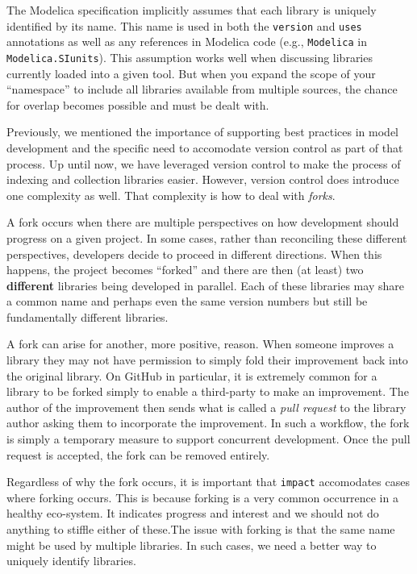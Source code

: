 \documentclass[11pt,a4paper,twocolumn]{article}
\newcommand{\code}[1]{\texttt{#1}} %
\begin{document}
The Modelica specification implicitly assumes that each library is
uniquely identified by its name.  This name is used in both the
\code{version} and \code{uses} annotations as well as any references
in Modelica code (e.g., \code{Modelica} in \code{Modelica.SIunits}).
This assumption works well when discussing libraries currently loaded
into a given tool.  But when you expand the scope of your
``namespace'' to include all libraries available from multiple
sources, the chance for overlap becomes possible and must be dealt
with.

Previously, we mentioned the importance of supporting best practices
in model development and the specific need to accomodate version
control as part of that process.  Up until now, we have leveraged
version control to make the process of indexing and collection
libraries easier.  However, version control does introduce one
complexity as well.  That complexity is how to deal with \emph{forks}.

A fork occurs when there are multiple perspectives on how development
should progress on a given project.  In some cases, rather than
reconciling these different perspectives, developers decide to proceed
in different directions.  When this happens, the project becomes
``forked'' and there are then (at least) two \textbf{different} libraries
being developed in parallel.  Each of these libraries may share a
common name and perhaps even the same version numbers but still be
fundamentally different libraries.

A fork can arise for another, more positive, reason.  When someone
improves a library they may not have permission to simply fold their
improvement back into the original library.  On GitHub in particular,
it is extremely common for a library to be forked simply to enable a
third-party to make an improvement.  The author of the improvement
then sends what is called a \emph{pull request} to the library author
asking them to incorporate the improvement.  In such a workflow, the
fork is simply a temporary measure to support concurrent development.
Once the pull request is accepted, the fork can be removed entirely.

Regardless of why the fork occurs, it is important that \code{impact}
accomodates cases where forking occurs.  This is because forking is a
very common occurrence in a healthy eco-system.  It indicates progress
and interest and we should not do anything to stiffle either of
these.The issue with forking is that the same name might be used by
multiple libraries.  In such cases, we need a better way to uniquely
identify libraries.
\end{document}
